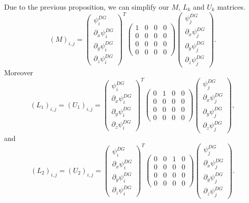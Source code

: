 \documentclass[a4paper, 11pt]{report}
\begin{document}
Due to the previous proposition, we can simplify our $M$, $L_k$ and $U_k$ matrices.
\begin{equation*}
(M)_{i,j}=\begin{pmatrix}\psi^{DG}_i \\ \partial_x \psi^{DG}_i \\ \partial_y\psi^{DG}_i \\ \partial_z \psi^{DG}_i \end{pmatrix}^{T}\begin{pmatrix}1&0&0&0\\0&0&0&0\\0&0&0&0\\0&0&0&0\end{pmatrix}\begin{pmatrix}\psi^{DG}_j \\ \partial_x \psi^{DG}_j \\ \partial_y\psi^{DG}_j \\ \partial_z \psi^{DG}_j \end{pmatrix}.
\end{equation*}
Moreover
\begin{equation*}
(L_1)_{i,j}=(U_1)_{i,j}=\begin{pmatrix}\psi^{DG}_i \\ \partial_x \psi^{DG}_i \\ \partial_y\psi^{DG}_i \\ \partial_z \psi^{DG}_i \end{pmatrix}^{T}\begin{pmatrix}0&1&0&0\\0&0&0&0\\0&0&0&0\\0&0&0&0\end{pmatrix}\begin{pmatrix}\psi^{DG}_j \\ \partial_x \psi^{DG}_j \\ \partial_y\psi^{DG}_j \\ \partial_z \psi^{DG}_j \end{pmatrix},
\end{equation*}
and
\begin{equation*}
(L_2)_{i,j}=(U_2)_{i,j}=\begin{pmatrix}\psi^{DG}_i \\ \partial_x \psi^{DG}_i \\ \partial_y\psi^{DG}_i \\ \partial_z \psi^{DG}_i\end{pmatrix}^{T}\begin{pmatrix}0&0&1&0\\0&0&0&0\\0&0&0&0\\0&0&0&0\end{pmatrix}\begin{pmatrix}\psi^{DG}_j \\ \partial_x \psi^{DG}_j \\ \partial_y\psi^{DG}_j \\ \partial_z \psi^{DG}_j \end{pmatrix}.
\end{equation*}
\end{document}
